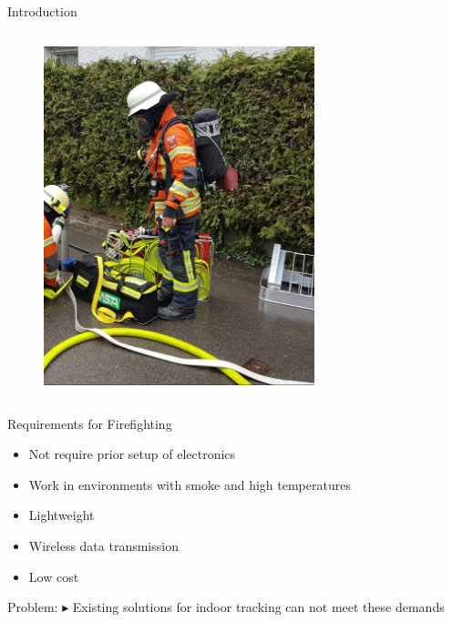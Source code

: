 \documentclass[aspectratio=169]{beamer}
\begin{document}
{\begin{frame}{Introduction}
\begin{columns}
				\begin{figure}
					\centering
					\includegraphics[width=0.7\textwidth]{firefighter.png}
				\end{figure}
	
		\end{columns}
		
		
	\end{frame}
	
	\begin{frame}{Requirements for Firefighting}
		\begin{itemize}
			\item Not require prior setup of electronics
			\item Work in environments with smoke and high temperatures
			\item Lightweight %
			\item Wireless data transmission %
			\item Low cost %
		\end{itemize}
		
		\begin{block}{Problem:}
			$\blacktriangleright$ Existing solutions for indoor tracking can not meet these demands
		\end{block}
		
	\end{frame}
	
}
\end{document}
